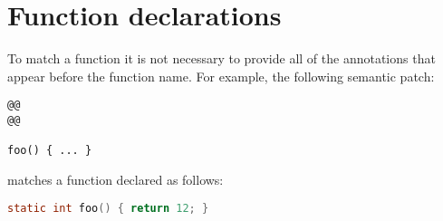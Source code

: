 \section{Function declarations}

\begin{grammar}







\end{grammar}

\begin{grammar}
\end{grammar}

To match a function it is not necessary to provide all of the annotations
that appear before the function name.  For example, the following semantic
patch:

\begin{lstlisting}[language=Cocci]
@@
@@

foo() { ... }
\end{lstlisting}

\noindent
matches a function declared as follows:

\begin{lstlisting}[language=C]
static int foo() { return 12; }
\end{lstlisting}

